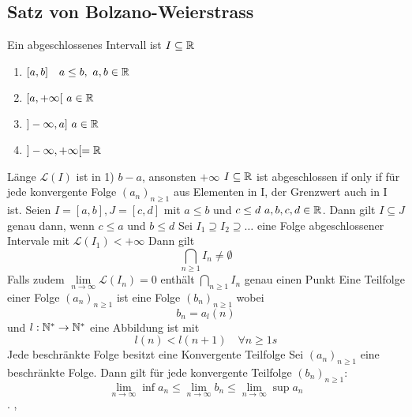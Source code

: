 \subsection{Satz von Bolzano-Weierstrass}
\Def[2.21] Ein abgeschlossenes Intervall ist \(I \subseteq \mathbb{R}\)
\begin{enumerate}
    \item [1] \([a,b] \quad a \leq b,\  a,b \in \mathbb{R}\)
    \item [2] \([a,+\infty[$ $a \in \R\)
    \item [3] \(]-\infty,a]$ $a \in \R\)
    \item [4] \(]-\infty,+\infty[ = \mathbb{R}\)
\end{enumerate}
Länge \(\mathcal{L}(I)\) ist in 1) $b-a$, ansonsten $+\infty$ \newline
\Bem[2.22] $I \subseteq \mathbb{R}$ ist abgeschlossen if only if für jede konvergente Folge \((a_n)_{n \geq 1}\) aus Elementen in I, der Grenzwert auch in I ist. \newline
\Bem[2.23] Seien \( I = [a,b], J = [c,d]\) mit \(a \leq b \) und \(c \leq d \ a,b,c,d \in \mathbb{R}\). Dann gilt \( I \subseteq J \) genau dann, wenn \(c \leq a \) und \(b \leq d\) \newline \newline \newline
{} Sei \(I_1 \supseteq I_2 \supseteq \dots\) eine Folge abgeschlossener Intervale mit \(\mathcal{L}(I_1) < +\infty\)
Dann gilt \[ {\bigcap}_{n\geq1} I_{n} \neq \emptyset \] Falls zudem \(\lim\limits_{n \rightarrow \infty} \mathcal{L}(I_n) = 0\) enthält \({\bigcap}_{n\geq1} I_{n}\) genau einen Punkt \newline
\Def[2.27] Eine Teilfolge einer Folge \((a_n)_{n \geq 1}\) ist eine Folge \((b_n)_{n \geq 1}\) wobei \[b_n = a_l(n)\] und \(l: \mathbb{N}^* \rightarrow \mathbb{N}^*\) eine Abbildung ist mit \[l(n) < l(n+1) \quad \forall n \geq 1s\] 
 Jede beschränkte Folge besitzt eine Konvergente Teilfolge \newline
\Bem[2.30] Sei \((a_n)_{n \geq 1}\) eine beschränkte Folge. Dann gilt für jede konvergente Teilfolge \((b_n)_{n \geq 1} :\) \[\lim\limits_{n \rightarrow \infty} \inf a_n \leq \lim\limits_{n \rightarrow \infty} b_n \leq \lim\limits_{n \rightarrow \infty} \sup a_n\].
\sep

